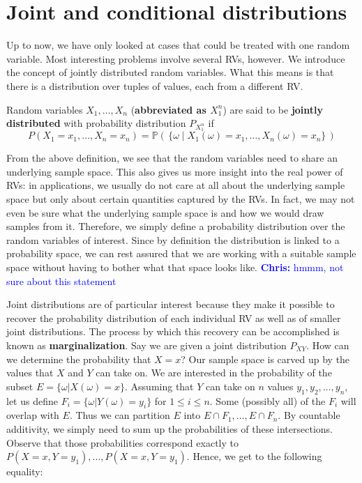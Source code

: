 \documentclass[a4paper,11pt,leqno]{report}
\newcommand{\chris}[1]{ \textcolor{blue}{\textbf{Chris:} #1}}
\begin{document}
\section{Joint and conditional distributions}

Up to now, we have only looked at cases that could be treated with one random variable. Most interesting problems involve several RVs, however. We introduce the concept of jointly distributed random variables. What this means is that
there is a distribution over tuples of values, each from a different RV.

\begin{Definition}
Random variables $ X_{1}, \ldots, X_{n} $ (\textbf{abbreviated as $ X^{n}_{1} $}) 
are said to be \textbf{jointly distributed} with probability distribution $ P_{X_{1}^{n}} $ if
$$ P(X_{1}=x_{1}, \ldots, X_{n}=x_{n}) = \mathbb{P}(\, \{\omega \mid X_{1}(\omega) = x_{1}, \ldots, X_{n}(\omega)=x_{n}\}\, ) $$
\end{Definition}

From the above definition, we see that the random variables need to
share an underlying sample space. This also gives us more insight into
the real power of RVs: in applications, we usually do not care at all
about the underlying sample space but only about certain quantities
captured by the RVs. In fact, we may not even be sure what the
underlying sample space is and how we would draw samples from
it. Therefore, we simply define a probability distribution over the
random variables of interest. Since by definition the distribution is
linked to a probability space, we can rest assured that we are working
with a suitable sample space without having to bother what that space
looks like. \chris{hmmm, not sure about this statement}

Joint distributions are of particular interest because they make it possible to recover the probability distribution of each individual
RV as well as of smaller joint distributions. The process by which this recovery can be accomplished is known as \textbf{marginalization}. Say
we are given a joint distribution $ P_{XY} $. How can we determine the probability that $ X=x $? Our sample space is carved
up by the values that $ X $ and $ Y $ can take on. We are interested in the probability of the subset $ E = \{\omega|X(\omega)=x\} $.
Assuming that $ Y $ can take on $ n $ values $y_1,y_2,\ldots,y_n$, let us define $ F_{i} = \{\omega| Y(\omega) = y_{i}\} $ for $ 1 \leq i \leq n $.
Some (possibly all) of the $ F_{i} $ will overlap with $ E $. Thus we can partition $ E $ into $ E\cap F_{1}, \ldots, E \cap F_{n} $.
By countable additivity, we simply need to sum up the probabilities of these intersections. Observe that those probabilities correspond exactly to $ P(X=x,Y=y_{1}), \ldots, P(X=x,Y=y_{1}) $. Hence, we get to the following equality:
\end{document}
